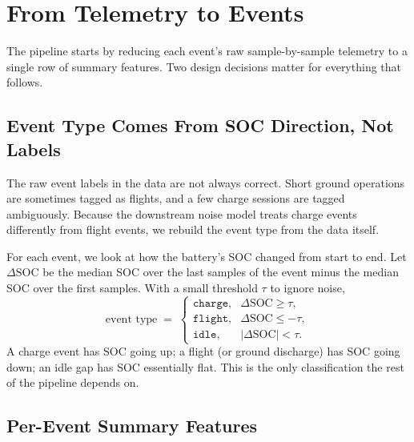 \documentclass[11pt]{article}
\begin{document}
\section{From Telemetry to Events}

The pipeline starts by reducing each event's raw sample-by-sample
telemetry to a single row of summary features. Two design decisions
matter for everything that follows.

\subsection{Event Type Comes From SOC Direction, Not Labels}

The raw event labels in the data are not always correct. Short ground
operations are sometimes tagged as flights, and a few charge sessions
are tagged ambiguously. Because the downstream noise model treats charge
events differently from flight events, we rebuild the event type from
the data itself.

For each event, we look at how the battery's SOC changed from start to
end. Let \(\Delta\mathrm{SOC}\) be the median SOC over the last samples
of the event minus the median SOC over the first samples. With a small
threshold \(\tau\) to ignore noise,
\begin{equation}
\text{event type} \;=\;
\begin{cases}
\texttt{charge}, & \Delta\mathrm{SOC} \ge \tau, \\
\texttt{flight}, & \Delta\mathrm{SOC} \le -\tau, \\
\texttt{idle},   & |\Delta\mathrm{SOC}| < \tau.
\end{cases}
\end{equation}
A charge event has SOC going up; a flight (or ground discharge) has SOC
going down; an idle gap has SOC essentially flat. This is the only
classification the rest of the pipeline depends on.

\subsection{Per-Event Summary Features}
\end{document}
